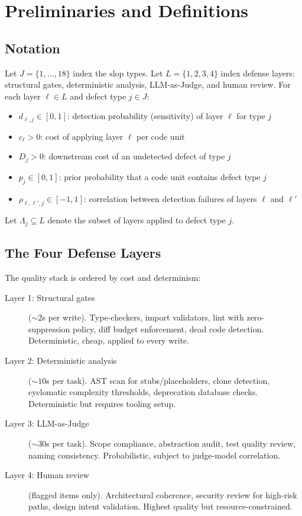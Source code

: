 \documentclass[11pt, a4paper, copyright]{googledeepmind}
\begin{document}
\section{Preliminaries and Definitions}
\label{sec:prelim}

\subsection{Notation}

Let $J = \{1, \ldots, 18\}$ index the slop types. Let $L = \{1, 2, 3, 4\}$ index defense layers: structural gates, deterministic analysis, LLM-as-Judge, and human review. For each layer $\ell \in L$ and defect type $j \in J$:

\begin{itemize}
\item $d_{\ell,j} \in [0,1]$: detection probability (sensitivity) of layer $\ell$ for type $j$
\item $c_\ell > 0$: cost of applying layer $\ell$ per code unit
\item $D_j > 0$: downstream cost of an undetected defect of type $j$
\item $p_j \in [0,1]$: prior probability that a code unit contains defect type $j$
\item $\rho_{\ell,\ell',j} \in [-1,1]$: correlation between detection failures of layers $\ell$ and $\ell'$
\end{itemize}

Let $\Lambda_j \subseteq L$ denote the subset of layers applied to defect type $j$.

\subsection{The Four Defense Layers}

The quality stack is ordered by cost and determinism:

\begin{description}
\item[Layer 1: Structural gates] (${\sim}2$s per write). Type-checkers, import validators, lint with zero-suppression policy, diff budget enforcement, dead code detection. Deterministic, cheap, applied to every write.

\item[Layer 2: Deterministic analysis] (${\sim}10$s per task). AST scan for stubs/placeholders, clone detection, cyclomatic complexity thresholds, deprecation database checks. Deterministic but requires tooling setup.

\item[Layer 3: LLM-as-Judge] (${\sim}30$s per task). Scope compliance, abstraction audit, test quality review, naming consistency. Probabilistic, subject to judge-model correlation.

\item[Layer 4: Human review] (flagged items only). Architectural coherence, security review for high-risk paths, design intent validation. Highest quality but resource-constrained.
\end{description}
\end{document}
